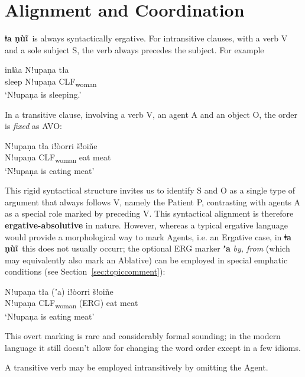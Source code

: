 \documentclass[11pt]{book}
\newcommand{\qcn}[1]{\textbf{#1}}
\newcommand{\langname}{\qcn{ǂa ṇùĩ}~}
\newcommand{\transl}[2]{\qcn{#1} \emph{#2}}
\newcommand{\grammsc}[1]{\textsc{#1}}
\newcommand{\CLF}[1]{\grammsc{CLF}\textsubscript{#1}}
\newcommand{\ERG}{\grammsc{ERG}}
\begin{document}
\section{Alignment and Coordination}

\langname is always syntactically ergative. For intransitive clauses, with a verb V and a sole subject S, the verb always precedes the subject. For example

\begin{exe}
	\ex
	\gll inǁàa Nǃupaṇa tła \\
	sleep Nǃupaṇa \CLF{woman}\\
	\glt `Nǃupaṇa is sleeping.'
\end{exe}

In a transitive clause, involving a verb V, an agent A and an object O, the order is \emph{fixed} as AVO:

\begin{exe}
	\ex
	\gll Nǃupaṇa 	tła 	iǃòorri 	šǃoiňe \\
		Nǃupaṇa 	\CLF{woman} 	eat 	meat\\
	\glt `Nǃupaṇa is eating meat'
\end{exe}

This rigid syntactical structure invites us to identify S and O as a single type of argument that always follows V, namely the Patient P, contrasting with agents A as a special role marked by preceding V. This syntactical alignment is therefore \textbf{ergative-absolutive} in nature. However, whereas a typical ergative language would provide a morphological way to mark Agents, i.e. an Ergative case, in \langname this does not usually occurr; the optional \ERG{} marker \transl{ʼa}{by, from} (which may equivalently also mark an Ablative) can be employed in special emphatic conditions (see Section~\ref{sec:topiccomment}):

\begin{exe}
	\ex
	\gll Nǃupaṇa 	tła  (ʼa)	iǃòorri  	šǃoiňe \\
		Nǃupaṇa 	\CLF{woman} (\ERG) 	eat 	meat\\
	\glt `Nǃupaṇa is eating meat'
\end{exe}

This overt marking is rare and considerably formal sounding; in the modern language it still doesn't allow for changing the word order except in a few idioms.

A transitive verb may be employed intransitively by omitting the Agent.
\end{document}
